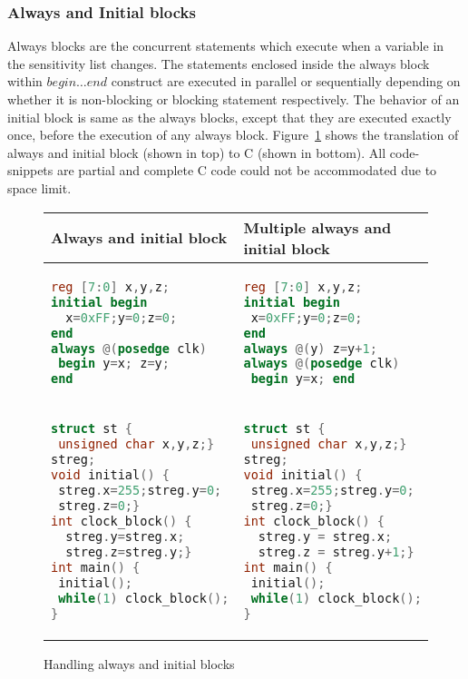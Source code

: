 \subsubsection{Always and Initial blocks}
Always blocks are the concurrent statements which execute when a 
variable in the sensitivity list changes. The statements enclosed inside the 
always block within $begin \ldots end$ construct are executed in parallel
or sequentially depending on whether it is non-blocking or blocking statement 
respectively.   The behavior of an initial block is same as the always blocks, 
except that they are executed exactly once, before the execution of any 
always block. Figure~\ref{figure:always-init} shows the translation of always
and initial block (shown in top) to C (shown in bottom). All code-snippets are
partial and complete C code could not be accommodated due to space limit.
%
\begin{figure}[htbp]
\scriptsize
\begin{tabular}{l|l}
\hline
Always and initial block & Multiple always and initial block\\
\hline
\begin{lstlisting}[mathescape=true,language=Verilog]
reg [7:0] x,y,z;
initial begin  
  x=0xFF;y=0;z=0; 
end
always @(posedge clk) 
 begin y=x; z=y;
end
\end{lstlisting}
& 
\begin{lstlisting}[mathescape=true,language=Verilog]
reg [7:0] x,y,z;
initial begin  
 x=0xFF;y=0;z=0; 
end
always @(y) z=y+1;
always @(posedge clk) 
 begin y=x; end
\end{lstlisting}
\\
\hline 
\begin{lstlisting}[mathescape=true,language=C]
struct st {
 unsigned char x,y,z;} 
streg;
void initial() {
 streg.x=255;streg.y=0;
 streg.z=0;}
int clock_block() {
  streg.y=streg.x; 
  streg.z=streg.y;}
int main() {
 initial();
 while(1) clock_block();
}
\end{lstlisting}
&
\begin{lstlisting}[mathescape=true,language=C]
struct st {
 unsigned char x,y,z;} 
streg;
void initial() { 
 streg.x=255;streg.y=0;
 streg.z=0;}
int clock_block() {
  streg.y = streg.x; 
  streg.z = streg.y+1;}
int main() {
 initial();
 while(1) clock_block();
} 
\end{lstlisting}
\\
\hline
\end{tabular}
\caption{Handling always and initial blocks}
\label{figure:always-init}
\end{figure}

